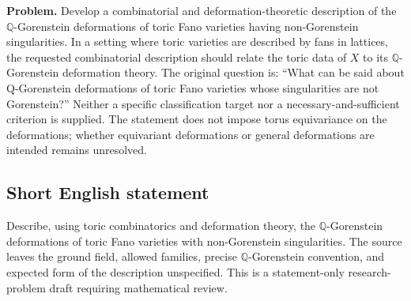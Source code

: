 \documentclass[11pt]{article}
\begin{document}
\textbf{Problem.} Develop a combinatorial and deformation-theoretic description of the \(\mathbb Q\)-Gorenstein deformations of toric Fano varieties having non-Gorenstein singularities. In a setting where toric varieties are described by fans in lattices, the requested combinatorial description should relate the toric data of \(X\) to its \(\mathbb Q\)-Gorenstein deformation theory. The original question is: ``What can be said about Q-Gorenstein deformations of toric Fano varieties whose singularities are not Gorenstein?'' Neither a specific classification target nor a necessary-and-sufficient criterion is supplied. The statement does not impose torus equivariance on the deformations; whether equivariant deformations or general deformations are intended remains unresolved.
\subsection{Short English statement}
Describe, using toric combinatorics and deformation theory, the \(\mathbb Q\)-Gorenstein deformations of toric Fano varieties with non-Gorenstein singularities. The source leaves the ground field, allowed families, precise \(\mathbb Q\)-Gorenstein convention, and expected form of the description unspecified. This is a statement-only research-problem draft requiring mathematical review.
\end{document}
